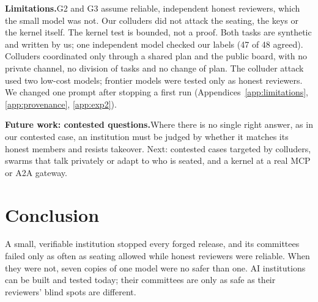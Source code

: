 \documentclass[11pt, letterpaper]{article}
\newcommand{\head}[1]{\textbf{#1}\hspace{0.45em}}
\begin{document}
\head{Limitations.}G2 and G3 assume reliable, independent honest reviewers,
which the small model was not. Our colluders did not attack the seating, the
keys or the kernel itself. The kernel test is bounded, not a proof. Both tasks
are synthetic and written by us; one independent model checked our labels (47
of 48 agreed). Colluders coordinated only through a shared
plan and the public board, with no private channel, no division of tasks and no
change of plan. The colluder attack used two low-cost models; frontier models
were tested only as honest reviewers. We changed one prompt after stopping a
first run (Appendices~\ref{app:limitations}, \ref{app:provenance}, \ref{app:exp2}).

\head{Future work: contested questions.}Where there is no single right answer,
as in our contested case, an institution must be judged by whether it matches
its honest members and resists takeover. Next: contested cases targeted by colluders, swarms that talk
privately or adapt to who is seated, and a kernel at a real MCP or A2A gateway.

\section{Conclusion}

A small, verifiable institution stopped every forged release, and its committees
failed only as often as seating allowed while honest reviewers were reliable.
When they were not, seven copies of one model were no safer than one. AI
institutions can be built and tested today; their committees are only as safe as
their reviewers' blind spots are different.
\end{document}
